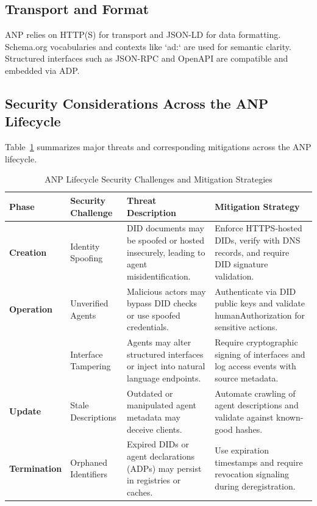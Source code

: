 \documentclass{article}
\begin{document}
\subsection{Transport and Format}
ANP relies on HTTP(S) for transport and JSON-LD for data formatting. Schema.org vocabularies and contexts like `ad:` are used for semantic clarity. Structured interfaces such as JSON-RPC and OpenAPI are compatible and embedded via ADP.

\subsection{Security Considerations Across the ANP Lifecycle}
Table~\ref{tab:anp-security-mitigations} summarizes major threats and corresponding mitigations across the ANP lifecycle.


\begin{table}
    \small
  \centering
  \renewcommand{\arraystretch}{1.3}
  \captionsetup{justification=centering}
  \caption{ANP Lifecycle Security Challenges and Mitigation Strategies}
  \label{tab:anp-security-mitigations}
  \begin{tabularx}{\textwidth}{|
      >{\centering\arraybackslash}p{2.3cm} |
      >{\raggedright\arraybackslash}X |
      >{\raggedright\arraybackslash}X |
      >{\raggedright\arraybackslash}X |
  }
    \hline
    \rowcolor{gray!30}
    \textbf{Phase} & \textbf{Security Challenge} & \textbf{Threat Description} & \textbf{Mitigation Strategy} \\
    \hline

    \textbf{Creation}
    & Identity Spoofing
    & DID documents may be spoofed or hosted insecurely, leading to agent misidentification.
    & Enforce HTTPS-hosted DIDs, verify with DNS records, and require DID signature validation. \\

    \textbf{Operation}
    & Unverified Agents
    & Malicious actors may bypass DID checks or use spoofed credentials.
    & Authenticate via DID public keys and validate humanAuthorization for sensitive actions. \\

    & Interface Tampering
    & Agents may alter structured interfaces or inject into natural language endpoints.
    & Require cryptographic signing of interfaces and log access events with source metadata. \\

    \textbf{Update}
    & Stale Descriptions
    & Outdated or manipulated agent metadata may deceive clients.
    & Automate crawling of agent descriptions and validate against known-good hashes. \\

    \textbf{Termination}
    & Orphaned Identifiers
    & Expired DIDs or agent declarations (ADPs) may persist in registries or caches.
    & Use expiration timestamps and require revocation signaling during deregistration. \\

    \hline
  \end{tabularx}
\end{table}
\end{document}
